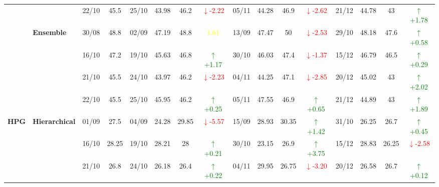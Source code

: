 \documentclass{ieeeaccess}
\begin{document}
{\begin{longtable}{llcc|cccc|cccc|cccc}
&
& 22/10 & 45.5 & 25/10 & 43.98 & 46.2 & \textcolor{red}{\(\downarrow\)-2.22} & 05/11 & 44.28 & 46.9 & \textcolor{red}{\(\downarrow\)-2.62} & 21/12 & 44.78 & 43 & \textcolor{green}{\(\uparrow\)+1.78} \\
\cmidrule(lr){2-16}



& \textbf{Ensemble}
& 30/08 & 48.8 & 02/09 & 47.19 & 48.8 & \textcolor{yellow}{1.61} & 13/09 & 47.47 & 50 & \textcolor{red}{\(\downarrow\)-2.53} & 29/10 & 48.18 & 47.6 & \textcolor{green}{\(\uparrow\)+0.58} \\

&
& 16/10 & 47.2 & 19/10 & 45.63 & 46.8 & \textcolor{green}{\(\uparrow\)+1.17} & 30/10 & 46.03 & 47.4 & \textcolor{red}{\(\downarrow\)-1.37} & 15/12 & 46.79 & 46.5 & \textcolor{green}{\(\uparrow\)+0.29} \\

&
& 21/10 & 45.5 & 24/10 & 43.97 & 46.2 & \textcolor{red}{\(\downarrow\)-2.23} & 04/11 & 44.25 & 47.1 & \textcolor{red}{\(\downarrow\)-2.85} & 20/12 & 45.02 & 43 & \textcolor{green}{\(\uparrow\)+2.02} \\

&
& 22/10 & 45.5 & 25/10 & 45.95 & 46.2 & \textcolor{green}{\(\uparrow\)+0.25} & 05/11 & 47.55 & 46.9 & \textcolor{green}{\(\uparrow\)+0.65} & 21/12 & 44.89 & 43 & \textcolor{green}{\(\uparrow\)+1.89} \\
\midrule


\multirow{12}{*}{\textbf{HPG}} 
& \textbf{Hierarchical}
& 01/09 & 27.5 & 04/09 & 24.28 & 29.85 & \textcolor{red}{\(\downarrow\)-5.57} & 15/09 & 28.93 & 30.35 & \textcolor{green}{\(\uparrow\)+1.42} & 31/10 & 26.25 & 26.7 & \textcolor{green}{\(\uparrow\)+0.45} \\

& 
& 16/10 & 28.25 & 19/10 & 28.21 & 28 & \textcolor{green}{\(\uparrow\)+0.21} & 30/10 & 23.15 & 26.9 & \textcolor{green}{\(\uparrow\)+3.75} & 15/12 & 28.83 & 26.25 & \textcolor{red}{\(\downarrow\)-2.58} \\

& 
& 21/10 & 26.8 & 24/10 & 26.18 & 26.4 & \textcolor{green}{\(\uparrow\)+0.22} & 04/11 & 29.95 & 26.75 & \textcolor{red}{\(\downarrow\)-3.20} & 20/12 & 26.58 & 26.7 & \textcolor{green}{\(\uparrow\)+0.12} \\


\end{longtable}}
\end{document}
